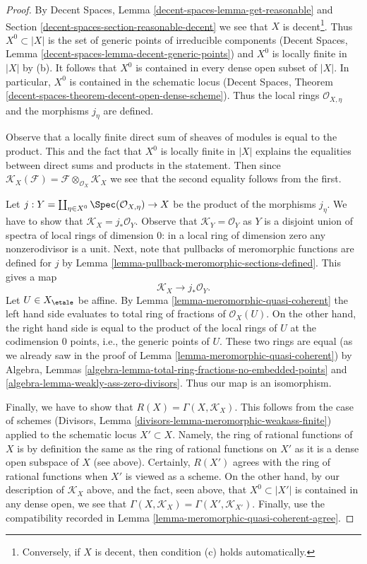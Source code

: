 \begin{proof}
By Decent Spaces, Lemma \ref{decent-spaces-lemma-get-reasonable} and
Section \ref{decent-spaces-section-reasonable-decent}
we see that $X$ is decent\footnote{Conversely, if $X$ is decent,
then condition (c) holds automatically.}.
Thus $X^0 \subset |X|$ is the set of generic points of irreducible
components
(Decent Spaces, Lemma \ref{decent-spaces-lemma-decent-generic-points})
and $X^0$ is locally finite in $|X|$ by (b).
It follows that $X^0$ is contained in every dense open subset of $|X|$.
In particular, $X^0$ is contained in the schematic locus
(Decent Spaces, Theorem \ref{decent-spaces-theorem-decent-open-dense-scheme}).
Thus the local rings $\mathcal{O}_{X, \eta}$ and the morphisms $j_\eta$
are defined.

\medskip\noindent
Observe that a locally finite direct sum of sheaves of modules
is equal to the product. This and the fact that $X^0$ is locally
finite in $|X|$ explains the equalities between
direct sums and products in the statement.
Then since $\mathcal{K}_X(\mathcal{F}) =
\mathcal{F} \otimes_{\mathcal{O}_X} \mathcal{K}_X$
we see that the second equality follows from the first.

\medskip\noindent
Let
$j : Y = \coprod\nolimits_{\eta \in X^0} \Spec(\mathcal{O}_{X, \eta}) \to X$
be the product of the morphisms $j_\eta$.
We have to show that $\mathcal{K}_X = j_*\mathcal{O}_Y$.
Observe that $\mathcal{K}_Y = \mathcal{O}_Y$ as $Y$ is a disjoint
union of spectra of local rings of dimension $0$: in a local
ring of dimension zero any nonzerodivisor is a unit.
Next, note that pullbacks of meromorphic
functions are defined for $j$ by
Lemma \ref{lemma-pullback-meromorphic-sections-defined}.
This gives a map
$$
\mathcal{K}_X \longrightarrow j_*\mathcal{O}_Y.
$$
Let $U \in X_\etale$ be affine. By Lemma \ref{lemma-meromorphic-quasi-coherent}
the left hand side evaluates to total ring of fractions of $\mathcal{O}_X(U)$.
On the other hand, the right hand side is equal to the product of the
local rings of $U$ at the codimension $0$ points, i.e., the generic points
of $U$. These two rings are equal (as we already saw in the proof
of Lemma \ref{lemma-meromorphic-quasi-coherent}) by
Algebra, Lemmas
\ref{algebra-lemma-total-ring-fractions-no-embedded-points} and
\ref{algebra-lemma-weakly-ass-zero-divisors}.
Thus our map is an isomorphism.

\medskip\noindent
Finally, we have to show that $R(X) = \Gamma(X, \mathcal{K}_X)$.
This follows from the case of schemes
(Divisors, Lemma \ref{divisors-lemma-meromorphic-weakass-finite})
applied to the schematic locus $X' \subset X$.
Namely, the ring of rational functions of $X$ is by definition
the same as the ring of rational functions on $X'$
as it is a dense open subspace of $X$ (see above).
Certainly, $R(X')$ agrees with the ring of rational functions
when $X'$ is viewed as a scheme.
On the other hand, by our description of $\mathcal{K}_X$ above,
and the fact, seen above, that $X^0 \subset |X'|$
is contained in any dense open, we see that
$\Gamma(X, \mathcal{K}_X) = \Gamma(X', \mathcal{K}_{X'})$.
Finally, use the compatibility recorded in
Lemma \ref{lemma-meromorphic-quasi-coherent-agree}.
\end{proof}

